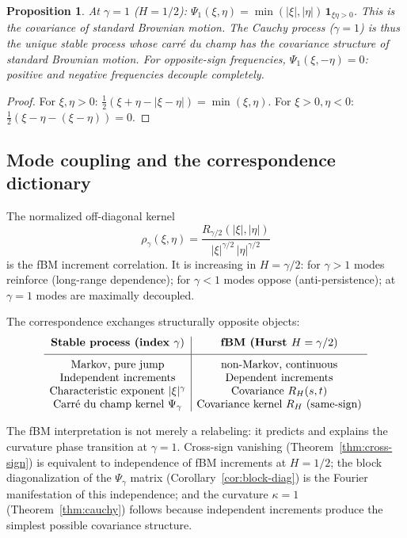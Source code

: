 \documentclass[11pt,a4paper]{article}
\theoremstyle{plain}
\newtheorem{proposition}[theorem]{Proposition}
\theoremstyle{definition}
\theoremstyle{remark}
\begin{document}
\begin{proposition}\label{prop:self-dual}
At $\gamma = 1$ ($H = 1/2$):
$\Psi_1(\xi,\eta)
= \min(|\xi|, |\eta|)\,\mathbf{1}_{\xi\eta > 0}$.
This is the covariance of standard Brownian motion.
The Cauchy process ($\gamma = 1$) is thus the unique stable process
whose carr\'e du champ has the covariance structure of standard
Brownian motion.
For opposite-sign frequencies, $\Psi_1(\xi,-\eta) = 0$:
positive and negative frequencies decouple completely.
\end{proposition}

\begin{proof}
For $\xi, \eta > 0$:
$\frac{1}{2}(\xi + \eta - |\xi - \eta|) = \min(\xi, \eta)$.
For $\xi > 0, \eta < 0$:
$\frac{1}{2}(\xi - \eta - (\xi - \eta)) = 0$.
\end{proof}


\subsection{Mode coupling and the correspondence dictionary}

The normalized off-diagonal kernel
\[
  \rho_\gamma(\xi,\eta)
  = \frac{R_{\gamma/2}(|\xi|,|\eta|)}
    {|\xi|^{\gamma/2}\,|\eta|^{\gamma/2}}
\]
is the fBM increment correlation. It is increasing in $H = \gamma/2$:
for $\gamma > 1$ modes reinforce (long-range dependence);
for $\gamma < 1$ modes oppose (anti-persistence);
at $\gamma = 1$ modes are maximally decoupled.

The correspondence exchanges structurally opposite objects:
\[
\begin{array}{c|c}
\textbf{Stable process (index } \gamma\text{)}
& \textbf{fBM (Hurst } H = \gamma/2\text{)} \\[4pt]
\hline
\rule{0pt}{12pt}
\text{Markov, pure jump} & \text{non-Markov, continuous} \\
\text{Independent increments} & \text{Dependent increments} \\
\text{Characteristic exponent } |\xi|^\gamma &
  \text{Covariance } R_H(s,t) \\
\text{Carr\'e du champ kernel } \Psi_\gamma &
  \text{Covariance kernel } R_H \text{ (same-sign)}
\end{array}
\]

The fBM interpretation is not merely a relabeling: it predicts and
explains the curvature phase transition at $\gamma = 1$.
Cross-sign vanishing (Theorem~\ref{thm:cross-sign}) is equivalent
to independence of fBM increments at $H = 1/2$; the block
diagonalization of the $\Psi_\gamma$ matrix
(Corollary~\ref{cor:block-diag}) is the Fourier manifestation
of this independence; and the curvature $\kappa = 1$
(Theorem~\ref{thm:cauchy}) follows because independent increments
produce the simplest possible covariance structure.
\end{document}

